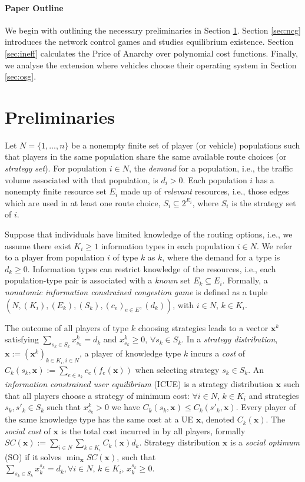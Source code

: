 \documentclass{article}
\begin{document}
\paragraph{Paper Outline}
   We begin with outlining the necessary preliminaries in Section \ref{sec:prelim}. Section \ref{sec:ncg} introduces the network control games and studies equilibrium existence. Section \ref{sec:ineff} calculates the Price of Anarchy over polynomial cost functions. Finally, we analyse the extension where vehicles choose their operating system in Section \ref{sec:osg}.

\section{Preliminaries} \label{sec:prelim}
    Let $N=\{ 1,...,n\}$  be a nonempty finite set of player (or vehicle) populations such that players in the same population share the same available route choices (or {\em strategy set}). For population $i\in N$, the {\em demand} for a population, i.e., the traffic volume associated with that population, is $d_i> 0$. Each population $i$ has a nonempty finite resource set $E_i$ made up of \textit{relevant} resources, i.e., those edges which are used in at least one route choice, $S_i \subseteq 2^{E_i}$, where $S_i$ is the strategy set of $i$.
    
    Suppose that individuals have limited knowledge of the routing options, i.e., we assume there exist $K_i \geq 1$ information types in each population $i \in N$.  We refer to a player from population $i$ of type $k$ as $k$, where the demand for a type is $d_{k}\geq 0$. Information types can restrict knowledge of the resources, i.e., each population-type pair is associated with a {\em known} set $E_{k} \subseteq E_i$. Formally, a \textit{nonatomic information constrained congestion game} is defined as a tuple $(N,(K_i),(E_{k}),(S_{k}), (c_e)_{e \in E}, (d_{k}))$, with $i \in N$, $k \in K_i$.
    
    The outcome of all players of type $k$ choosing strategies leads to a vector $\bm{x}^{k}$ satisfying $\sum_{s_{k} \in S_{k}} x^{k}_{s_{k}} = d_{k}$ and $x^{k}_{s_{k}} \geq 0, \,  \forall s_{k} \in S_{k}$. In a \textit{strategy distribution}, $\bm{x}:=(\bm{x}^k)_{k \in K_i, i \in N}$, a player of knowledge type $k$ incurs a \textit{cost} of $C_{k}(s_{k},\bm{x}):= \sum_{e \in s_{k}} c_e(f_e(\bm{x}))$ when selecting strategy $s_{k} \in S_{k}$. An \textit{information constrained user equilibrium} (ICUE) \cite{Acemoglu2016InformationalCongestion} is a strategy distribution $\bm{x}$ such that all players choose a strategy of minimum cost: $\forall i \in N, \, k \in K_i$ and strategies $s_{k}, s'_{k} \in S_k$ such that $x^k_{s_{k}}>0$ we have $C_{k}(s_{k},\bm{x}) \leq C_{k}(s'_{k},\bm{x})$. Every player of the same knowledge type has the same cost at a UE $\bm{x}$, denoted $C_{k}(\bm{x})$. 
    The \textit{social cost} of $\bm{x}$ is the total cost incurred in by all players, formally $SC(\bm{x}):=\sum_{i \in N} \sum_{k \in K_i} C_{k} (\bm{x})d_{k}$. Strategy distribution $\bm{x}$ is a \textit{social optimum} (SO) if it solves $\min_{\bm{x}} SC(\bm{x})$, such that $\sum_{s_k \in S_{k}} x_{k}^{s_k} = d_{k},\forall i \in N,\, k \in K_i,\, x_{k}^{s_k} \geq 0$. 
	
\end{document}
